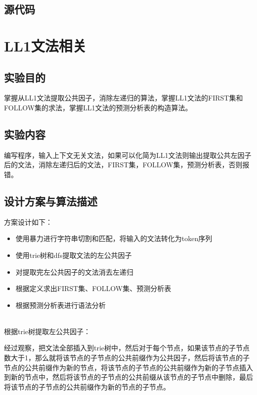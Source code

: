 \documentclass{hdureport}
\begin{document}
\newpage

\subsection{源代码}



\newpage

\section{LL1文法相关}


\subsection{实验目的}
掌握从LL1文法提取公共因子，消除左递归的算法，掌握LL1文法的FIRST集和FOLLOW集的求法，掌握LL1文法的预测分析表的构造算法。

\subsection{实验内容}
编写程序，输入上下文无关文法，如果可以化简为LL1文法则输出提取公共左因子后的文法，消除左递归后的文法，FIRST集，FOLLOW集，预测分析表，否则报错。

\subsection{设计方案与算法描述}
方案设计如下：
\begin{itemize}
    \item {使用暴力进行字符串切割和匹配，将输入的文法转化为token序列}
    \item {使用trie树和dfs提取文法的左公共因子}
    \item {对提取完左公共因子的文法消去左递归}
    \item {根据定义求出FIRST集、FOLLOW集、预测分析表}
    \item {根据预测分析表进行语法分析}
\end{itemize}

\quad \\
根据trie树提取左公共因子：

经过观察，把文法全部插入到trie树中，然后对于每个节点，如果该节点的子节点数大于1，那么就将该节点的子节点的公共前缀作为公共因子，然后将该节点的子节点的公共前缀作为新的节点，将该节点的子节点的公共前缀作为新的子节点插入到新的节点中，然后将该节点的子节点的公共前缀从该节点的子节点中删除，最后将该节点的子节点的公共前缀作为新的节点的子节点。
\end{document}
